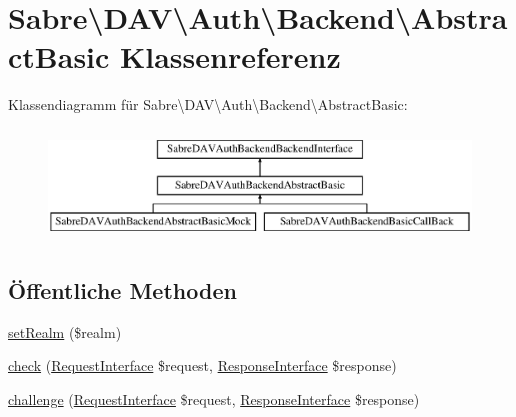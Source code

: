 \hypertarget{class_sabre_1_1_d_a_v_1_1_auth_1_1_backend_1_1_abstract_basic}{}\section{Sabre\textbackslash{}D\+AV\textbackslash{}Auth\textbackslash{}Backend\textbackslash{}Abstract\+Basic Klassenreferenz}
\label{class_sabre_1_1_d_a_v_1_1_auth_1_1_backend_1_1_abstract_basic}
Klassendiagramm für Sabre\textbackslash{}D\+AV\textbackslash{}Auth\textbackslash{}Backend\textbackslash{}Abstract\+Basic\+:\begin{figure}[H]
\begin{center}
\leavevmode
\includegraphics[height=2.989324cm]{class_sabre_1_1_d_a_v_1_1_auth_1_1_backend_1_1_abstract_basic}
\end{center}
\end{figure}
\subsection*{Öffentliche Methoden}
\begin{DoxyCompactItemize}
\item 
\mbox{\hyperlink{class_sabre_1_1_d_a_v_1_1_auth_1_1_backend_1_1_abstract_basic_a8582876ecef0d2d39ac54bb51773c1ab}{set\+Realm}} (\$realm)
\item 
\mbox{\hyperlink{class_sabre_1_1_d_a_v_1_1_auth_1_1_backend_1_1_abstract_basic_a1dfc9862b792365d1a3ce06b026fe119}{check}} (\mbox{\hyperlink{interface_sabre_1_1_h_t_t_p_1_1_request_interface}{Request\+Interface}} \$request, \mbox{\hyperlink{interface_sabre_1_1_h_t_t_p_1_1_response_interface}{Response\+Interface}} \$response)
\item 
\mbox{\hyperlink{class_sabre_1_1_d_a_v_1_1_auth_1_1_backend_1_1_abstract_basic_a114ac7dc4af3f4421d38b1c295eb0e92}{challenge}} (\mbox{\hyperlink{interface_sabre_1_1_h_t_t_p_1_1_request_interface}{Request\+Interface}} \$request, \mbox{\hyperlink{interface_sabre_1_1_h_t_t_p_1_1_response_interface}{Response\+Interface}} \$response)
\end{DoxyCompactItemize}
